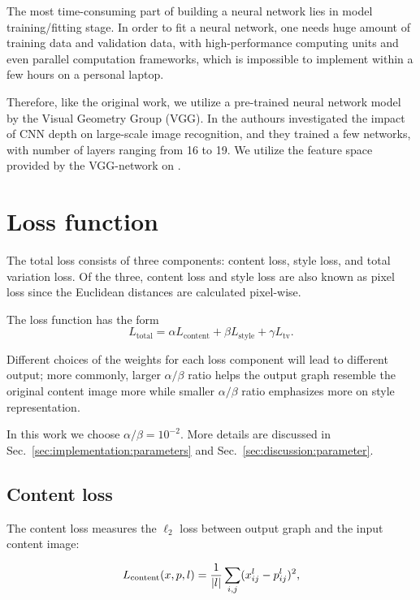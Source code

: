 The most time-consuming part of building a neural network lies in model training/fitting stage.
In order to fit a neural network, one needs huge amount of training data and validation data,
with high-performance computing units and even parallel computation frameworks,
which is impossible to implement within a few hours on a personal laptop.

Therefore, like the original work, we utilize a pre-trained neural network model by the Visual Geometry Group (VGG).
In \cite{Simonyan:2014ws} the authours investigated the impact of CNN depth on large-scale image recognition,
and they trained a few networks, with number of layers ranging from 16 to 19.
We utilize the feature space provided by the VGG-network on \cite{vgg}.



\section{Loss function}
\label{sec:foundation:loss}

The total loss consists of three components: content loss, style loss, and total variation loss.
Of the three, content loss and style loss are also known as pixel loss since
the Euclidean distances are calculated pixel-wise.

The loss function has the form
    \begin{equation}
    \label{eq:loss:total}
    L_{\text{total}} = \alpha L_{\text{content}} + \beta L_{\text{style}} + \gamma L_{\text{tv}}.
    \end{equation}

Different choices of the weights for each loss component will lead to different output;
more commonly, larger $\alpha / \beta$ ratio helps the output graph resemble the original content image more
while smaller $\alpha / \beta$ ratio emphasizes more on style representation.

In this work we choose $\alpha / \beta = 10^{-2}$.
More details are discussed in Sec.\ \ref{sec:implementation:parameters} and
Sec.\ \ref{sec:discussion:parameter}.


\subsection{Content loss}
The content loss measures the $\ell_2$ loss between output graph and the input content image:

	\begin{equation}
	L_{\text{content}}(x, p, l) = \frac{1}{\lvert l\rvert}\sum_{i, j}(x_{ij}^l - p_{ij}^l)^2,
	\end{equation}

